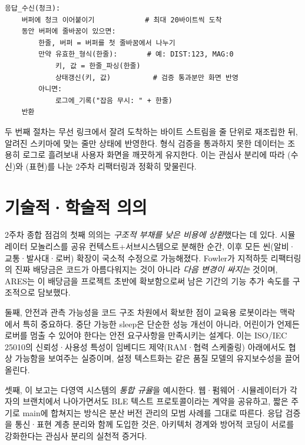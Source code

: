 \begin{verbatim}
응답_수신(청크):
    버퍼에 청크 이어붙이기            # 최대 20바이트씩 도착
    동안 버퍼에 줄바꿈이 있으면:
        한줄, 버퍼 = 버퍼를 첫 줄바꿈에서 나누기
        만약 유효한_형식(한줄):       # 예: DIST:123, MAG:0
            키, 값 = 한줄_파싱(한줄)
            상태갱신(키, 값)          # 검증 통과분만 화면 반영
        아니면:
            로그에_기록("잡음 무시: " + 한줄)
    반환
\end{verbatim}

두 번째 절차는 무선 링크에서 잘려 도착하는 바이트 스트림을 줄 단위로 재조립한 뒤, 알려진 스키마에 맞는 줄만 상태에 반영한다. 형식 검증을 통과하지 못한 데이터는 조용히 로그로 흘려보내 사용자 화면을 깨끗하게 유지한다. 이는 관심사 분리에 따라 (수신)와 (표현)를 나눈 2주차 리팩터링과 정확히 맞물린다.

\section{기술적·학술적 의의}

2주차 종합 점검의 첫째 의의는 \emph{구조적 부채를 낮은 비용에 상환}했다는 데 있다. 시뮬레이터 모놀리스를 공유 컨텍스트+서브시스템으로 분해한 순간, 이후 모든 씬(알비·교통·발사대·로버) 확장이 국소적 수정으로 가능해졌다. Fowler가 지적하듯 리팩터링의 진짜 배당금은 코드가 아름다워지는 것이 아니라 \emph{다음 변경이 싸지는} 것이며\cite{fowler2018refactoring}, ARES는 이 배당금을 프로젝트 초반에 확보함으로써 남은 기간의 기능 추가 속도를 구조적으로 담보했다.

둘째, 안전과 관측 가능성을 코드 구조 차원에서 확보한 점이 교육용 로봇이라는 맥락에서 특히 중요하다. 중단 가능한 sleep은 단순한 성능 개선이 아니라, 어린이가 언제든 로버를 멈출 수 있어야 한다는 안전 요구사항을 만족시키는 설계다. 이는 ISO/IEC 25010의 신뢰성·사용성 특성이 임베디드 제약(RAM·협력 스케줄링) 아래에서도 협상 가능함을 보여주는 실증이며\cite{iso25010}, 설정 텍스트화는 같은 품질 모델의 유지보수성을 끌어올린다.

셋째, 이 보고는 다영역 시스템의 \emph{통합 규율}을 예시한다. 웹·펌웨어·시뮬레이터가 각자의 브랜치에서 나아가면서도 BLE 텍스트 프로토콜이라는 계약을 공유하고, 짧은 주기로 main에 합쳐지는 방식은 분산 버전 관리의 모범 사례를 그대로 따른다\cite{chacon2014progit}. 응답 검증을 통신·표현 계층 분리와 함께 도입한 것은, 아키텍처 경계와 방어적 코딩이 서로를 강화한다는 관심사 분리의 실천적 증거다\cite{martin2008cleancode}.

